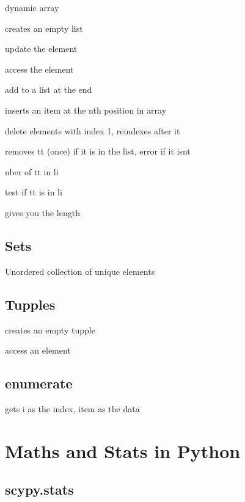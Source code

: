 		dynamic array

		 creates an empty list


		 update the element

		 access the element

		  add to a list at the end

		 inserts an item at the nth position in array

		 delete elements with index 1, reindexes after it

		 removes tt (once) if it is in the list, error if it isnt

		 nber of tt in li

		 test if tt is in li

		 gives you the length


	\subsection{Sets}

		Unordered collection of unique elements



	\subsection{Tupples}
		
		 creates an empty tupple


		 access an element


	\subsection{enumerate}

		 gets i as the index, item as the data





\section{Maths and Stats in Python}

	\subsection{scypy.stats}


